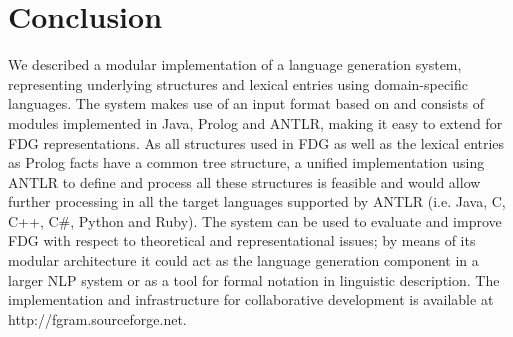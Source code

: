 \documentclass[a4paper, halfparskip, onecolumn, abstractoff, final]{scrartcl}
\newcommand{\noun}[1]{\textsc{#1}}
\begin{document}



\section{Conclusion}
\normalsize
We described a modular implementation of a language generation system, representing underlying structures and lexical entries using domain-specific languages. The system makes use of an input format based on \cite{Dik1997a} and consists of modules implemented in Java, Prolog and ANTLR, making it easy to extend for FDG representations. As all structures used in FDG as well as the lexical entries as Prolog facts have a common tree structure, a unified implementation using ANTLR to define and process all these structures is feasible and would allow further processing in all the target languages supported by ANTLR (i.e. Java, C, C++, C\#, Python and Ruby). The system can be used to evaluate and improve FDG with respect to theoretical and representational issues; by means of its modular architecture it could act as the language generation component in a larger NLP system or as a tool for formal notation in linguistic description. The implementation and infrastructure for collaborative development is available at http://fgram.sourceforge.net.

\onehalfspacing




\end{document}
